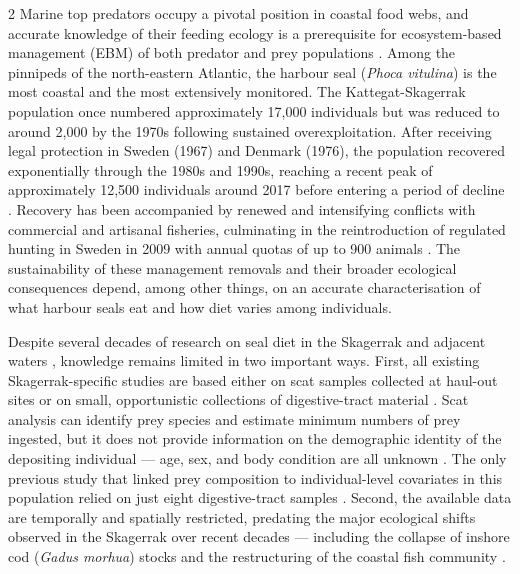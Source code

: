 \begin{spacing}{2}
Marine top predators occupy a pivotal position in coastal food webs, and
accurate knowledge of their feeding ecology is a prerequisite for
ecosystem-based management (EBM) of both predator and prey populations
\citep{Hilborn2017, BowenLidgard2013}. Among the pinnipeds of the
north-eastern Atlantic, the harbour seal (\textit{Phoca vitulina}) is the
most coastal and the most extensively monitored. The Kattegat-Skagerrak
population once numbered approximately 17,000 individuals
\citep{HeideHarkonen1988} but was reduced to around 2,000 by the 1970s
following sustained overexploitation. After receiving legal protection in
Sweden (1967) and Denmark (1976), the population recovered exponentially
through the 1980s and 1990s, reaching a recent peak of approximately 12,500
individuals around 2017 before entering a period of decline
\citep{Carroll2025, Larsson2024}. Recovery has been accompanied by renewed
and intensifying conflicts with commercial and artisanal fisheries,
culminating in the reintroduction of regulated hunting in Sweden in 2009
with annual quotas of up to 900 animals \citep{ICES2023}. The
sustainability of these management removals and their broader ecological
consequences depend, among other things, on an accurate characterisation of
what harbour seals eat and how diet varies among individuals.

Despite several decades of research on seal diet in the Skagerrak and
adjacent waters \citep{Harkonen1987, Harkonen1988a, HarkonenHeide1991,
OlsenBjorge1995, Sorlie2020}, knowledge remains limited in two important
ways. First, all existing Skagerrak-specific studies are based either on
scat samples collected at haul-out sites or on small, opportunistic
collections of digestive-tract material \citep{Stromberg2012}. Scat
analysis can identify prey species and estimate minimum numbers of prey
ingested, but it does not provide information on the demographic identity of
the depositing individual --- age, sex, and body condition are all unknown
\citep{BowenIverson2013, daSilva1985, GrEllier2005}. The only previous
study that linked prey composition to individual-level covariates in this
population relied on just eight digestive-tract samples
\citep{Stromberg2012}. Second, the available data are temporally and
spatially restricted, predating the major ecological shifts observed in the
Skagerrak over recent decades --- including the collapse of inshore cod
(\textit{Gadus morhua}) stocks and the restructuring of the coastal fish
community \citep{Cardinale2017, Carroll2025}.


\end{spacing}
